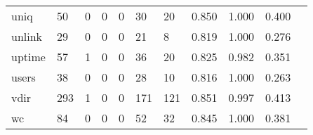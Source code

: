 \begin{longtable}{lp{1.20cm}p{1.20cm}p{1.20cm}p{1.20cm}p{1.20cm}p{1.20cm}p{1.20cm}p{1.20cm}p{1.20cm}p{1.20cm}}
uniq      &                                    50 &                                                  0 &                                                  0 &                                                  0 &                                                 30 &                                                 20 &                                         0.850 &                                              1.000 &                                              0.400 \\
unlink    &                                    29 &                                                  0 &                                                  0 &                                                  0 &                                                 21 &                                                  8 &                                         0.819 &                                              1.000 &                                              0.276 \\
uptime    &                                    57 &                                                  1 &                                                  0 &                                                  0 &                                                 36 &                                                 20 &                                         0.825 &                                              0.982 &                                              0.351 \\
users     &                                    38 &                                                  0 &                                                  0 &                                                  0 &                                                 28 &                                                 10 &                                         0.816 &                                              1.000 &                                              0.263 \\
vdir      &                                   293 &                                                  1 &                                                  0 &                                                  0 &                                                171 &                                                121 &                                         0.851 &                                              0.997 &                                              0.413 \\
wc        &                                    84 &                                                  0 &                                                  0 &                                                  0 &                                                 52 &                                                 32 &                                         0.845 &                                              1.000 &                                              0.381 \\

\end{longtable}
